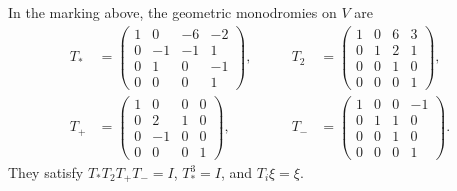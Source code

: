 \begin{proposition}
\label{mon:representation}
In the marking above, the geometric monodromies on $V$ are
\begin{equation}
\begin{alignedat}{2}
 T_*&=\begin{pmatrix}
 1&0&-6&-2\\0&-1&-1&1\\0&1&0&-1\\0&0&0&1
 \end{pmatrix},
 &\qquad T_2&=\begin{pmatrix}
 1&0&6&3\\0&1&2&1\\0&0&1&0\\0&0&0&1
 \end{pmatrix},\\[1ex]
 T_+&=\begin{pmatrix}
 1&0&0&0\\0&2&1&0\\0&-1&0&0\\0&0&0&1
 \end{pmatrix},
 &\qquad T_-&=\begin{pmatrix}
 1&0&0&-1\\0&1&1&0\\0&0&1&0\\0&0&0&1
 \end{pmatrix}.
\end{alignedat}
\label{mon:matrices}
\end{equation}
They satisfy $T_*T_2T_+T_-=I$, $T_*^3=I$, and $T_i\xi=\xi$.
\end{proposition}
